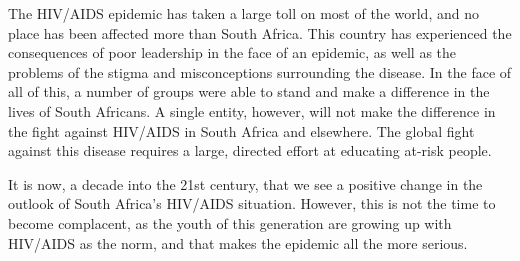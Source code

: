 \documentclass[12pt]{report}
\begin{document}
The HIV/AIDS epidemic has taken a large toll on most of the world, and no place has been affected more than South Africa.
This country has experienced the consequences of poor leadership in the face of an epidemic, as well as the problems of the stigma and misconceptions surrounding the disease.
In the face of all of this, a number of groups were able to stand and make a difference in the lives of South Africans.
A single entity, however, will not make the difference in the fight against HIV/AIDS in South Africa and elsewhere.
The global fight against this disease requires a large, directed effort at educating at-risk people.

It is now, a decade into the 21st century, that we see a positive change in the outlook of South Africa's HIV/AIDS situation.
However, this is not the time to become complacent, as the youth of this generation are growing up with HIV/AIDS as the norm, and that makes the epidemic all the more serious.
\end{document}
